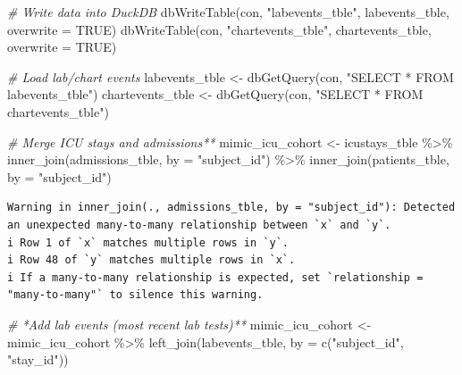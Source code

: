 \documentclass[
]{article}
\newenvironment{Shaded}{\begin{snugshade}}{\end{snugshade}}
\newcommand{\AttributeTok}[1]{\textcolor[rgb]{0.77,0.63,0.00}{#1}}
\newcommand{\CommentTok}[1]{\textcolor[rgb]{0.56,0.35,0.01}{\textit{#1}}}
\newcommand{\ConstantTok}[1]{\textcolor[rgb]{0.00,0.00,0.00}{#1}}
\newcommand{\FunctionTok}[1]{\textcolor[rgb]{0.00,0.00,0.00}{#1}}
\newcommand{\NormalTok}[1]{\textcolor[rgb]{0.00,0.00,0.00}{#1}}
\newcommand{\OtherTok}[1]{\textcolor[rgb]{0.56,0.35,0.01}{#1}}
\newcommand{\SpecialCharTok}[1]{\textcolor[rgb]{0.00,0.00,0.00}{#1}}
\newcommand{\StringTok}[1]{\textcolor[rgb]{0.31,0.60,0.02}{#1}}
\begin{document}
\begin{Shaded}
\begin{Highlighting}[]
\CommentTok{\# Write data into DuckDB}
\FunctionTok{dbWriteTable}\NormalTok{(con, }\StringTok{"labevents\_tble"}\NormalTok{, labevents\_tble, }\AttributeTok{overwrite =} \ConstantTok{TRUE}\NormalTok{)}
\FunctionTok{dbWriteTable}\NormalTok{(con, }\StringTok{"chartevents\_tble"}\NormalTok{, chartevents\_tble, }\AttributeTok{overwrite =} \ConstantTok{TRUE}\NormalTok{)}

\CommentTok{\# Load lab/chart events}
\NormalTok{labevents\_tble }\OtherTok{\textless{}{-}} \FunctionTok{dbGetQuery}\NormalTok{(con, }\StringTok{"SELECT * FROM labevents\_tble"}\NormalTok{)}
\NormalTok{chartevents\_tble }\OtherTok{\textless{}{-}} \FunctionTok{dbGetQuery}\NormalTok{(con, }\StringTok{"SELECT * FROM chartevents\_tble"}\NormalTok{)}
\end{Highlighting}
\end{Shaded}

\begin{Shaded}
\begin{Highlighting}[]
\CommentTok{\# Merge ICU stays and admissions**}
\NormalTok{mimic\_icu\_cohort }\OtherTok{\textless{}{-}}\NormalTok{ icustays\_tble }\SpecialCharTok{\%\textgreater{}\%}
  \FunctionTok{inner\_join}\NormalTok{(admissions\_tble, }\AttributeTok{by =} \StringTok{"subject\_id"}\NormalTok{) }\SpecialCharTok{\%\textgreater{}\%}
  \FunctionTok{inner\_join}\NormalTok{(patients\_tble, }\AttributeTok{by =} \StringTok{"subject\_id"}\NormalTok{)}
\end{Highlighting}
\end{Shaded}

\begin{verbatim}
Warning in inner_join(., admissions_tble, by = "subject_id"): Detected an unexpected many-to-many relationship between `x` and `y`.
i Row 1 of `x` matches multiple rows in `y`.
i Row 48 of `y` matches multiple rows in `x`.
i If a many-to-many relationship is expected, set `relationship = "many-to-many"` to silence this warning.
\end{verbatim}

\begin{Shaded}
\begin{Highlighting}[]
\CommentTok{\# *Add lab events (most recent lab tests)**}
\NormalTok{mimic\_icu\_cohort }\OtherTok{\textless{}{-}}\NormalTok{ mimic\_icu\_cohort }\SpecialCharTok{\%\textgreater{}\%}
  \FunctionTok{left\_join}\NormalTok{(labevents\_tble, }\AttributeTok{by =} \FunctionTok{c}\NormalTok{(}\StringTok{"subject\_id"}\NormalTok{, }\StringTok{"stay\_id"}\NormalTok{))}
\end{Highlighting}
\end{Shaded}
\end{document}
